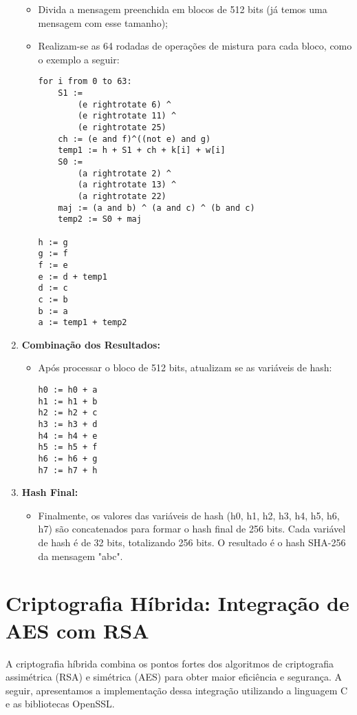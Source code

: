 \documentclass[a4paper,12pt]{article}
\begin{document}
\begin{enumerate}
\begin{itemize}
            \item Divida a mensagem preenchida em blocos de 512 bits (já temos uma mensagem com esse tamanho);
            \item Realizam-se as 64 rodadas de operações de mistura para cada bloco, como o exemplo a seguir:
            \begin{lstlisting}
for i from 0 to 63:
    S1 :=
        (e rightrotate 6) ^
        (e rightrotate 11) ^
        (e rightrotate 25)
    ch := (e and f)^((not e) and g)
    temp1 := h + S1 + ch + k[i] + w[i]
    S0 :=
        (a rightrotate 2) ^
        (a rightrotate 13) ^
        (a rightrotate 22)
    maj := (a and b) ^ (a and c) ^ (b and c)
    temp2 := S0 + maj

h := g
g := f
f := e
e := d + temp1
d := c
c := b
b := a
a := temp1 + temp2
            \end{lstlisting}
        \end{itemize}
    \item \textbf{Combinação dos Resultados:}
        \begin{itemize}
            \item Após processar o bloco de 512 bits, atualizam se as variáveis de hash:
            \begin{lstlisting}
h0 := h0 + a
h1 := h1 + b
h2 := h2 + c
h3 := h3 + d
h4 := h4 + e
h5 := h5 + f
h6 := h6 + g
h7 := h7 + h
            \end{lstlisting}
        \end{itemize}
    \item \textbf{Hash Final:}
        \begin{itemize}
            \item Finalmente, os valores das variáveis de hash (h0, h1, h2, h3, h4, h5, h6, h7) são concatenados para formar o hash final de 256 bits. Cada variável de hash é de 32 bits, totalizando 256 bits. O resultado é o hash SHA-256 da mensagem "abc".
        \end{itemize}
\end{enumerate}

\section*{Criptografia Híbrida: Integração de AES com RSA}
A criptografia híbrida combina os pontos fortes dos algoritmos de criptografia assimétrica (RSA) e simétrica (AES) para obter maior eficiência e segurança. A seguir, apresentamos a implementação dessa integração utilizando a linguagem C e as bibliotecas OpenSSL.
\end{document}
